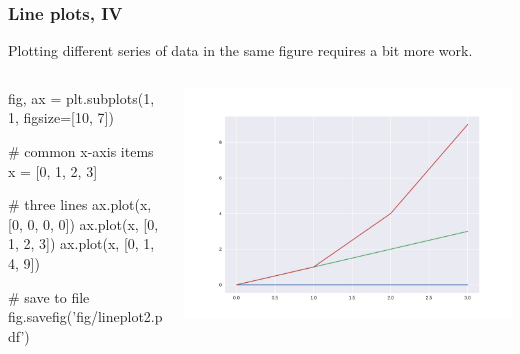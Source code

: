 \documentclass[english,serif,mathserif,xcolor=pdftex,dvipsnames,table]{beamer}
\begin{document}
\begin{frame}[fragile]
  \frametitle{Line plots, IV}
    Plotting different series of data in the same figure requires a bit more work.

\begin{columns}
    \begin{column}{0.5\linewidth}
      \begin{python}
fig, ax = plt.subplots(1, 1, figsize=[10, 7])

# common x-axis items
x = [0, 1, 2, 3]

# three lines
ax.plot(x, [0, 0, 0, 0])
ax.plot(x, [0, 1, 2, 3])
ax.plot(x, [0, 1, 4, 9])


# save to file
fig.savefig('fig/lineplot2.pdf')
      \end{python}
    \end{column}
    \begin{column}{0.5\linewidth}
      \begin{center}
        \includegraphics[width=1.0\linewidth]{fig/lineplot2.pdf}
      \end{center}
    \end{column}
  \end{columns}
\end{frame}
\end{document}
